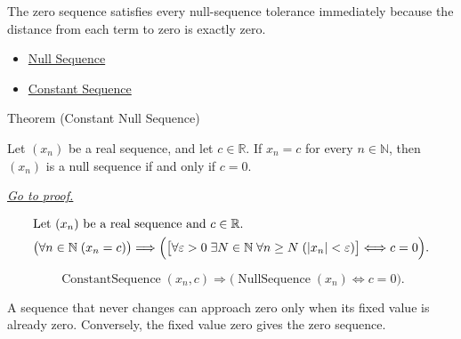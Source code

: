 \begin{remark*}[Interpretation]
The zero sequence satisfies every null-sequence tolerance immediately because
the distance from each term to zero is exactly zero.
\end{remark*}

\begin{dependencies}
\begin{itemize}
  \item \hyperref[def:null-sequence]{Null Sequence}
  \item \hyperref[def:constant-sequence]{Constant Sequence}
\end{itemize}
\end{dependencies}


\begin{theorembox}{Theorem (Constant Null Sequence)}
\begin{theorem}
\label{thm:constant-null-sequence}
Let $(x_n)$ be a real sequence, and let $c \in \mathbb{R}$. If $x_n = c$
for every $n \in \mathbb{N}$, then $(x_n)$ is a null sequence if and only if
$c = 0$.

\smallskip
\noindent
\hyperref[prf:constant-null-sequence]{\textit{Go to proof.}}
\end{theorem}
\end{theorembox}

\begin{remark*}
\[
\begin{aligned}
&\text{Let } (x_n) \text{ be a real sequence and } c \in \mathbb{R}.\\
&\bigl(\forall n \in \mathbb{N}\;(x_n = c)\bigr)
\Longrightarrow
\Bigl(
\bigl[
\forall \varepsilon > 0\;
\exists N \in \mathbb{N}\;
\forall n \ge N\;(|x_n| < \varepsilon)
\bigr]
\Longleftrightarrow c = 0
\Bigr).
\end{aligned}
\]
\end{remark*}

\begin{remark*}
\[
\operatorname{ConstantSequence}(x_n,c)
\Longrightarrow
\bigl(\operatorname{NullSequence}(x_n) \Longleftrightarrow c = 0\bigr).
\]
\end{remark*}

\begin{remark*}[Interpretation]
A sequence that never changes can approach zero only when its fixed value is
already zero. Conversely, the fixed value zero gives the zero sequence.
\end{remark*}

